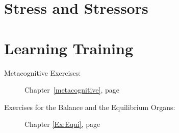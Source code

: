 \documentclass[../main.tex]{subfiles}
\begin{document}
%
\section{Stress and Stressors}

\section{Learning Training}
\begin{description}
\item[Metacognitive Exercises:] Chapter~\ref{metacognitive}, page~\pageref{metacognitive}
  \item[Exercises for the Balance and the Equilibrium Organs:] Chapter \ref{Ex:Equi}, page~\pageref{Ex:Equi}
\end{description}
\end{document}
